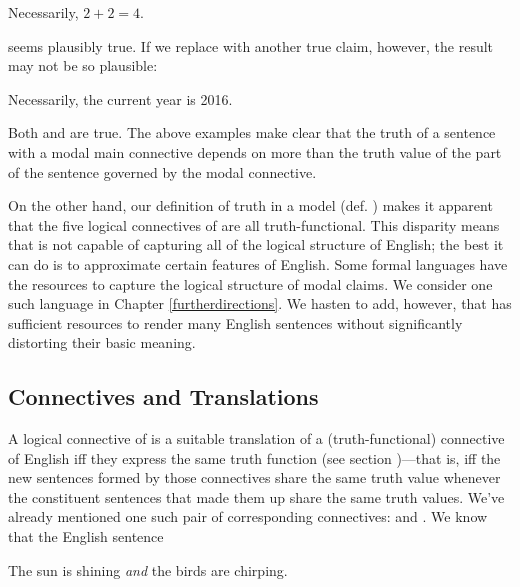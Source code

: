 \begin{menumerate}
	\item Necessarily, $2+2=4$.
\end{menumerate}

\noindent{}seems plausibly true.  If we replace  with another true claim, however, the result may not be so plausible:

\begin{menumerate}
	\item Necessarily, the current year is 2016.
\end{menumerate}

\noindent{}Both  and  are true.  The above examples make clear that the truth of a sentence with a modal main connective depends on more than the truth value of the part of the sentence governed by the modal connective.  

On the other hand, our definition of truth in a model (def. ) makes it apparent that the five logical connectives of \GSL{} are all truth-functional.  This disparity means that \GSL{} is not capable of capturing all of the logical structure of English; the best it can do is to approximate certain features of English.  Some formal languages have the resources to capture the logical structure of modal claims.  We consider one such language in Chapter \ref{furtherdirections}.  We hasten to add, however, that \GSL{} has sufficient resources to render many English sentences without significantly distorting their basic meaning.

\subsection{Connectives and Translations}\label{GSLConnectives and Trans}

A logical connective of \GSL{} is a suitable translation of a (truth-functional) connective of English iff they express the same truth function (see section )---that is, iff the new sentences formed by those connectives share the same truth value whenever the constituent sentences that made them up share the same truth values.  We've already mentioned one such pair of corresponding connectives:  and \mention{$\WEDGE$}.  We know that the English sentence

\begin{menumerate}
	\item\label{GSLTransConjunction1} The sun is shining \emph{and} the birds are chirping.
\end{menumerate}


